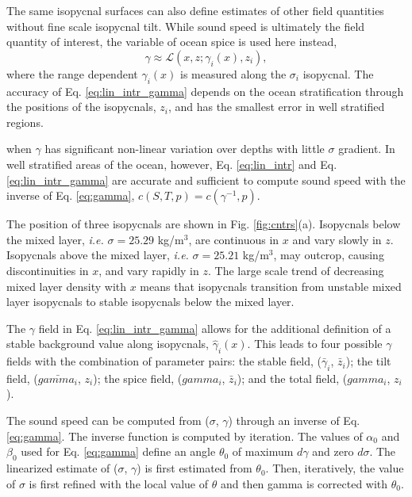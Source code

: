 \documentclass[preprint,NumberedRefs]{JASA}
\begin{document}
The same isopycnal surfaces can also define estimates of other field quantities without fine scale isopycnal tilt. While sound speed is ultimately the field quantity of interest, the variable of ocean spice is used here instead,
\begin{equation}
    \gamma\approx\mathcal{L}(x, z; \gamma_i(x), z_i),
    \label{eq:lin_intr_gamma}
\end{equation}
where the range dependent $\gamma_i(x)$ is measured along the $\sigma_i$ isopycnal. The accuracy of Eq. \eqref{eq:lin_intr_gamma} depends on the ocean stratification through the positions of the isopycnals, $z_i$, and has the smallest error in well stratified regions.

when $\gamma$ has significant non-linear variation over depths with little $\sigma$ gradient. In well stratified areas of the ocean, however, Eq. \ref{eq:lin_intr} and Eq. \ref{eq:lin_intr_gamma} are accurate and sufficient to compute sound speed with the inverse of Eq. \eqref{eq:gamma}, $c(S, T, p)=c(\gamma^{-1}, p)$.

The position of three isopycnals are shown in Fig. \ref{fig:cntrs}(a). Isopycnals below the mixed layer, \emph{i.e.} $\sigma = 25.29$ kg/m$^3$, are continuous in $x$ and vary slowly in $z$. Isopycnals above the mixed layer, \emph{i.e.} $\sigma = 25.21$ kg/m$^3$, may outcrop, causing discontinuities in $x$, and vary rapidly in $z$. The large scale trend of decreasing mixed layer density with $x$ means that isopycnals transition from unstable mixed layer isopycnals to stable isopycnals below the mixed layer.

The $\gamma$ field in Eq. \eqref{eq:lin_intr_gamma} allows for the additional definition of a stable background value along isopycnals, $\hat{\gamma}_i(x)$. This leads to four possible $\gamma$ fields with the combination of parameter pairs: the stable field, ($\bar{\gamma}_i$, $\bar{z}_i$); the tilt field, ($\bar{gamma_i}$, $z_i$); the spice field, ($gamma_i$, $\bar{z}_i$); and the total field, ($gamma_i$, $z_i$).

The sound speed can be computed from ($\sigma$, $\gamma$) through an inverse of Eq. \eqref{eq:gamma}. The inverse function is computed by iteration. The values of $\alpha_0$ and $\beta_0$ used for Eq. \eqref{eq:gamma} define an angle $\theta_0$ of maximum $d\gamma$ and zero $d\sigma$. The linearized estimate of ($\sigma$, $\gamma$) is first estimated from $\theta_0$. Then, iteratively, the value of $\sigma$ is first refined with the local value of $\theta$ and then gamma is corrected with $\theta_0$.
\end{document}
